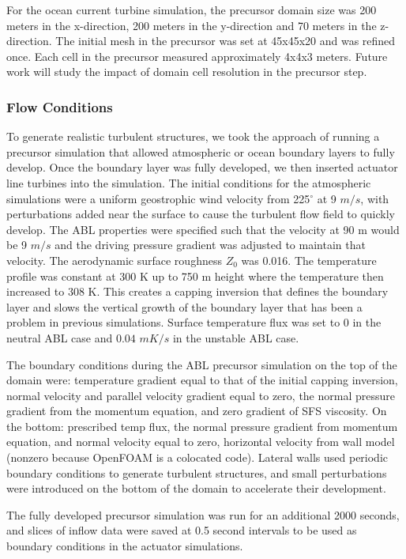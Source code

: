 For the ocean current turbine simulation, the precursor domain size was 200 meters in the x-direction, 200 meters in the y-direction and 70 meters in the z-direction. The initial mesh in the precursor was set at 45x45x20 and was refined once. Each cell in the precursor measured approximately 4x4x3 meters. Future work will study the impact of domain cell resolution in the precursor step.

\subsubsection{Flow Conditions}
To generate realistic turbulent structures, we took the approach of running a precursor simulation that allowed atmospheric or ocean boundary layers to fully develop.  Once the boundary layer was fully developed, we then inserted actuator line turbines into the simulation.  The initial conditions for the atmospheric simulations were a uniform geostrophic wind velocity from 225$^\circ$  at 9 $m/s$, with perturbations added near the surface to cause the turbulent flow field to quickly develop.  The ABL properties were specified such that the velocity at 90 m would be 9 $m/s$ and the driving pressure gradient was adjusted to maintain that velocity.  The aerodynamic surface roughness $Z_{0}$ was 0.016.  The temperature profile was constant at 300 K up to 750 m height where the temperature then increased to 308 K.  This creates a capping inversion that defines the boundary layer and slows the vertical growth of the boundary layer that has been a problem in previous simulations.  Surface temperature flux was set to 0 in the neutral ABL case and $0.04$ $mK/s$ in the unstable ABL case.


The boundary conditions during the ABL precursor simulation on the top of the domain were: temperature gradient equal to that of the initial capping inversion, normal velocity  and parallel velocity gradient equal to zero, the normal pressure gradient from the momentum equation, and zero gradient of SFS viscosity.  On the bottom: prescribed temp flux, the normal pressure gradient from momentum equation, and normal velocity equal to zero, horizontal velocity from wall model (nonzero because OpenFOAM is a colocated code).  Lateral walls used periodic boundary conditions to generate turbulent structures, and small perturbations were introduced on the bottom of the domain to accelerate their development.

The fully developed precursor simulation was run for an additional 2000 seconds, and slices of inflow data were saved at 0.5 second intervals to be used as boundary conditions in the actuator simulations.
